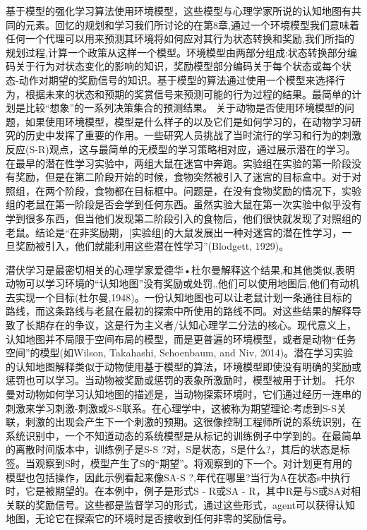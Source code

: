 基于模型的强化学习算法使用环境模型，这些模型与心理学家所说的认知地图有共同的元素。回忆的规划和学习我们所讨论的在第8章,通过一个环境模型我们意味着任何一个代理可以用来预测其环境将如何应对其行为状态转换和奖励,我们所指的规划过程,计算一个政策从这样一个模型。环境模型由两部分组成:状态转换部分编码关于行为对状态变化的影响的知识，奖励模型部分编码关于每个状态或每个状态-动作对期望的奖励信号的知识。基于模型的算法通过使用一个模型来选择行为，根据未来的状态和预期的奖赏信号来预测可能的行为过程的结果。最简单的计划是比较“想象”的一系列决策集合的预测结果。
关于动物是否使用环境模型的问题，如果使用环境模型，模型是什么样子的以及它们是如何学习的，在动物学习研究的历史中发挥了重要的作用。一些研究人员挑战了当时流行的学习和行为的刺激反应(S-R)观点，这与最简单的无模型的学习策略相对应，通过展示潜在的学习。在最早的潜在性学习实验中，两组大鼠在迷宫中奔跑。实验组在实验的第一阶段没有奖励，但是在第二阶段开始的时候，食物突然被引入了迷宫的目标盒中。对于对照组，在两个阶段，食物都在目标框中。问题是，在没有食物奖励的情况下，实验组的老鼠在第一阶段是否会学到任何东西。虽然实验大鼠在第一次实验中似乎没有学到很多东西，但当他们发现第二阶段引入的食物后，他们很快就发现了对照组的老鼠。结论是“在非奖励期，[实验组]的大鼠发展出一种对迷宫的潜在性学习，一旦奖励被引入，他们就能利用这些潜在性学习”(Blodgett, 1929)。

潜伏学习是最密切相关的心理学家爱德华•杜尔曼解释这个结果,和其他类似,表明动物可以学习环境的“认知地图”没有奖励或处罚,,他们可以使用地图后,他们有动机去实现一个目标(杜尔曼,1948)。一份认知地图也可以让老鼠计划一条通往目标的路线，而这条路线与老鼠在最初的探索中所使用的路线不同。对这些结果的解释导致了长期存在的争议，这是行为主义者/认知心理学二分法的核心。现代意义上，认知地图并不局限于空间布局的模型，而是更普遍的环境模型，或者是动物“任务空间”的模型(如Wilson, Takahashi, Schoenbaum, and Niv, 2014)。潜在学习实验的认知地图解释类似于动物使用基于模型的算法，环境模型即使没有明确的奖励或惩罚也可以学习。当动物被奖励或惩罚的表象所激励时，模型被用于计划。
托尔曼对动物如何学习认知地图的描述是，当动物探索环境时，它们通过经历一连串的刺激来学习刺激-刺激或S-S联系。在心理学中，这被称为期望理论:考虑到S-S关联，刺激的出现会产生下一个刺激的预期。这很像控制工程师所说的系统识别，在系统识别中，一个不知道动态的系统模型是从标记的训练例子中学到的。在最简单的离散时间版本中，训练例子是S-S ?对，S是状态，S是什么?，其后的状态是标签。当观察到S时，模型产生了S的“期望”。将观察到的下一个。对计划更有用的模型也包括操作，因此示例看起来像SA-S ?,年代在哪里?当行为A在状态s中执行时，它是被期望的。在本例中，例子是形式S - R或SA - R，其中R是与S或SA对相关联的奖励信号。这些都是监督学习的形式，通过这些形式，agent可以获得认知地图，无论它在探索它的环境时是否接收到任何非零的奖励信号。



